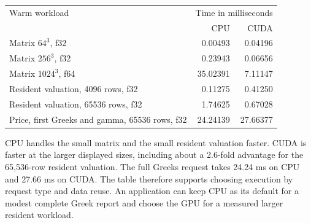 \documentclass[8pt]{strategynet-journal}
\begin{document}
\begin{SNcolumns}
\begin{center}
\begin{minipage}{\linewidth}
\centering
\begin{tabular}{@{}p{4.7cm}rr@{}}
\toprule
Warm workload & \multicolumn{2}{c}{Time in milliseconds}\\
 & CPU & CUDA\\
\midrule
Matrix $64^3$, f32 &0.00493&0.04196\\
Matrix $256^3$, f32 &0.23943&0.06656\\
Matrix $1024^3$, f64 &35.02391&7.11147\\
Resident valuation, 4096 rows, f32 &0.11275&0.41250\\
Resident valuation, 65536 rows, f32 &1.74625&0.67028\\
Price, first Greeks and gamma, 65536 rows, f32 &24.24139&27.66377\\
\bottomrule
\end{tabular}
\end{minipage}
\end{center}

CPU handles the small matrix and the small resident valuation faster. CUDA is faster at the larger displayed sizes,
including about a 2.6-fold advantage for the 65,536-row resident valuation.
The full Greeks request takes 24.24 ms on CPU and 27.66 ms on CUDA. The table
therefore supports choosing execution by request type and data reuse. An
application can keep CPU as its default for a modest complete Greek report
and choose the GPU for a measured larger resident workload.

\end{SNcolumns}
\clearpage
\end{document}
